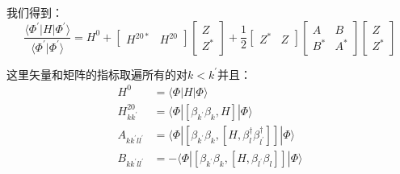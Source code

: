 我们得到：
\begin{equation}
\frac{\langle\Phi^{\prime}|H|\Phi^{\prime}\rangle}{\langle\Phi^{\prime}|\Phi^{\prime}\rangle}=H^{0}+\begin{bmatrix}H^{20*} & H^{20}\end{bmatrix}\begin{bmatrix}Z\\
Z^{*}
\end{bmatrix}+\frac{1}{2}\begin{bmatrix}Z^{*} & Z\end{bmatrix}\begin{bmatrix}A & B\\
B^{*} & A^{*}
\end{bmatrix}\begin{bmatrix}Z\\
Z^{*}
\end{bmatrix}\label{eq:HFB hamiltion expectation}
\end{equation}

这里矢量和矩阵的指标取遍所有的对$k<k^{\prime}$并且：
\begin{align*}
H^{0} & =\langle\Phi|H|\Phi\rangle\\
H^{20}_{kk^{\prime}} & =\langle\Phi|[\beta_{k^{\prime}}\beta_{k},H]|\Phi\rangle\\
A_{kk^{\prime}ll^{\prime}} & =\langle\Phi|[\beta_{k^{\prime}}\beta_{k},[H,\beta^{\dagger}_{l}\beta^{\dagger}_{l^{\prime}}]]|\Phi\rangle\\
B_{kk^{\prime}ll^{\prime}} & =-\langle\Phi|[\beta_{k^{\prime}}\beta_{k},[H,\beta_{l^{\prime}}\beta_{l}]]|\Phi\rangle
\end{align*}

